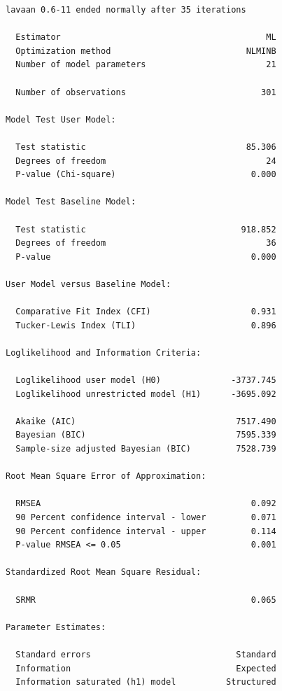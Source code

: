 \begin{verbatim}
lavaan 0.6-11 ended normally after 35 iterations

  Estimator                                         ML
  Optimization method                           NLMINB
  Number of model parameters                        21
                                                      
  Number of observations                           301
                                                      
Model Test User Model:
                                                      
  Test statistic                                85.306
  Degrees of freedom                                24
  P-value (Chi-square)                           0.000

Model Test Baseline Model:

  Test statistic                               918.852
  Degrees of freedom                                36
  P-value                                        0.000

User Model versus Baseline Model:

  Comparative Fit Index (CFI)                    0.931
  Tucker-Lewis Index (TLI)                       0.896

Loglikelihood and Information Criteria:

  Loglikelihood user model (H0)              -3737.745
  Loglikelihood unrestricted model (H1)      -3695.092
                                                      
  Akaike (AIC)                                7517.490
  Bayesian (BIC)                              7595.339
  Sample-size adjusted Bayesian (BIC)         7528.739

Root Mean Square Error of Approximation:

  RMSEA                                          0.092
  90 Percent confidence interval - lower         0.071
  90 Percent confidence interval - upper         0.114
  P-value RMSEA <= 0.05                          0.001

Standardized Root Mean Square Residual:

  SRMR                                           0.065

Parameter Estimates:

  Standard errors                             Standard
  Information                                 Expected
  Information saturated (h1) model          Structured


\end{verbatim}
